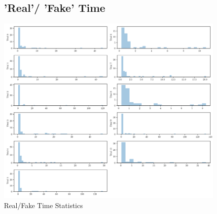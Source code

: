 \documentclass{report}
\theoremstyle{definition}
\begin{document}
\begin{figure}[H]
\hspace*{-3cm}
\begin{minipage}{1.5\linewidth}
\subsection{'Real'/ 'Fake' Time}
    \centering
    \centerline{
    \includegraphics[width=\textwidth]{exp1_stats_real_fake.pdf}}
    \caption{Real/Fake Time Statistics}
    \label{fig:exp1_stats_real_fake}
\end{minipage}
\end{figure}
\end{document}
